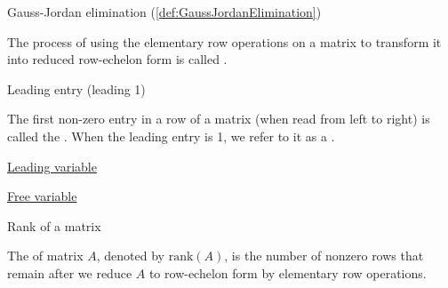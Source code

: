 \documentclass{ximera}
\begin{document}
\begin{center}
\end{center}

Gauss-Jordan elimination (\ref{def:GaussJordanElimination})
\begin{expandable}
    The process of using the elementary row operations on a matrix to transform it into reduced row-echelon form is called .
\end{expandable}

\begin{center}
\end{center}

Leading entry (leading 1)
\begin{expandable}
    The first non-zero entry in a row of a matrix (when read from left to right) is called the .  When the leading entry is 1, we refer to it as a .
\end{expandable}

\begin{center}
\end{center}

\href{https://ximera.osu.edu/oerlinalg/LinearAlgebra/SYS-0020/main}{Leading variable}

\begin{center}
\end{center}

\href{https://ximera.osu.edu/oerlinalg/LinearAlgebra/SYS-0020/main}{Free variable}

\begin{center}
\end{center}

Rank of a matrix
\begin{expandable}
    The  of matrix $A$, denoted by $\mbox{rank}(A)$, is the number of nonzero rows that remain after we reduce $A$ to row-echelon form by elementary row operations.
\end{expandable}
\end{document}

